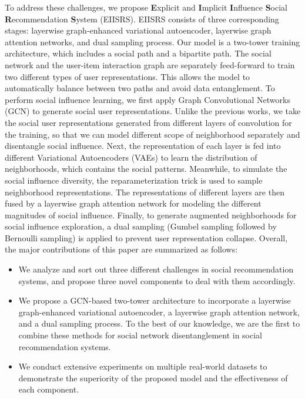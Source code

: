 \documentclass[letterpaper]{article} %
\begin{document}
To address these challenges, we propose \textbf{E}xplicit and \textbf{I}mplicit \textbf{I}nfluence \textbf{S}ocial \textbf{R}ecommendation \textbf{S}ystem (EIISRS). EIISRS consists of three corresponding stages: layerwise graph-enhanced variational autoencoder, layerwise graph attention networks, and dual sampling process. Our model is a two-tower training architecture, which includes a social path and a bipartite path. The social network and the user-item interaction graph are separately feed-forward to train two different types of user representations. This allows the model to automatically balance between two paths and avoid data entanglement. To perform social influence learning, we first apply Graph Convolutional Networks (GCN) to generate social user representations. Unlike the previous works, we take the social user representations generated from different layers of convolution for the training, so that we can model different scope of neighborhood separately and disentangle social influence. Next, the representation of each layer is fed into different Variational Autoencoders (VAEs) to learn the distribution of neighborhoods, which contains the social patterns. Meanwhile, to simulate the social influence diversity, the reparameterization trick is used to sample neighborhood representations. The representations of different layers are then fused by a layerwise graph attention network for modeling the different magnitudes of social influence. Finally, to generate augmented neighborhoods for social influence exploration, a dual sampling (Gumbel sampling followed by Bernoulli sampling) is applied to prevent user representation collapse. Overall, the major contributions of this paper are summarized as follows:

\begin{itemize}
    \item We analyze and sort out three different challenges in social recommendation systems, and propose three novel components to deal with them accordingly.
    \item We propose a GCN-based two-tower architecture to incorporate a layerwise graph-enhanced variational autoencoder, a layerwise graph attention network, and a dual sampling process. To the best of our knowledge, we are the first to combine these methods for social network disentanglement in social recommendation systems. 
    \item We conduct extensive experiments on multiple real-world datasets to demonstrate the superiority of the proposed model and the effectiveness of each component. 
\end{itemize}
\end{document}
